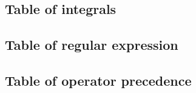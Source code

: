 \documentclass[titlepage,a4paper,10pt]{article}
\begin{document}
\begin{multicols}{2}
\begin{spacing}{0.8}
{			\subsection{Table of integrals}
				
			\subsection{Table of regular expression}
				
			\subsection{Table of operator precedence}
				
		}
		\end{spacing}
		\endgroup
	\end{multicols}
\end{document}
